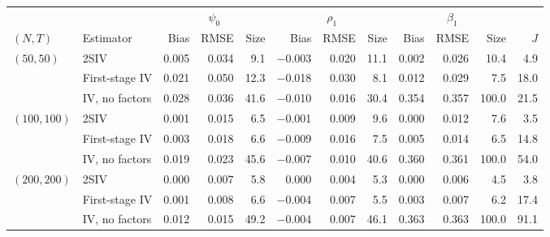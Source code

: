 \begin{tabular}{llrrrrrrrrrr}
\toprule
 & & \multicolumn{3}{c}{$\psi_0$} & \multicolumn{3}{c}{$\rho_1$} & \multicolumn{3}{c}{$\beta_1$} & \\
\cmidrule(lr){3-5}\cmidrule(lr){6-8}\cmidrule(lr){9-11}
$(N,T)$ & Estimator & Bias & RMSE & Size & Bias & RMSE & Size & Bias & RMSE & Size & $J$ \\
\midrule
$(50,50)$ & 2SIV & 0.005 & 0.034 & 9.1 & $-$0.003 & 0.020 & 11.1 & 0.002 & 0.026 & 10.4 & 4.9 \\
 & First-stage IV & 0.021 & 0.050 & 12.3 & $-$0.018 & 0.030 & 8.1 & 0.012 & 0.029 & 7.5 & 18.0 \\
 & IV, no factors & 0.028 & 0.036 & 41.6 & $-$0.010 & 0.016 & 30.4 & 0.354 & 0.357 & 100.0 & 21.5 \\
\addlinespace
$(100,100)$ & 2SIV & 0.001 & 0.015 & 6.5 & $-$0.001 & 0.009 & 9.6 & 0.000 & 0.012 & 7.6 & 3.5 \\
 & First-stage IV & 0.003 & 0.018 & 6.6 & $-$0.009 & 0.016 & 7.5 & 0.005 & 0.014 & 6.5 & 14.8 \\
 & IV, no factors & 0.019 & 0.023 & 45.6 & $-$0.007 & 0.010 & 40.6 & 0.360 & 0.361 & 100.0 & 54.0 \\
\addlinespace
$(200,200)$ & 2SIV & 0.000 & 0.007 & 5.8 & 0.000 & 0.004 & 5.3 & 0.000 & 0.006 & 4.5 & 3.8 \\
 & First-stage IV & 0.001 & 0.008 & 6.6 & $-$0.004 & 0.007 & 5.5 & 0.003 & 0.007 & 6.2 & 17.4 \\
 & IV, no factors & 0.012 & 0.015 & 49.2 & $-$0.004 & 0.007 & 46.1 & 0.363 & 0.363 & 100.0 & 91.1 \\
\bottomrule
\end{tabular}
